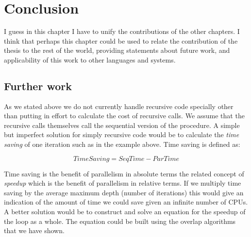 
\chapter{Conclusion}
\label{chap:conc}


I guess in this chapter I have to unify the contributions of the other
chapters.
I think that perhaps this chapter could be used to relate the contribution
of the thesis to the rest of the world, providing statements about future
work, and applicability of this work to other languages and systems.


\section{Further work}
\label{sec:further_work}





As we stated above we do not currently handle recursive code specially other
than putting in effort to calculate the cost of recursive calls.
We assume that the recursive calls themselves call the sequential version of
the procedure.
A simple but imperfect solution for simply recursive code would be to
calculate the \emph{time saving} of one iteration such as in the example
above.
Time saving is defined as:

\begin{equation*}
TimeSaving = SeqTime - ParTime
\end{equation*}

\noindent
Time saving is the benefit of parallelism in absolute terms
the related concept of \emph{speedup} which is the benefit of parallelism in
relative terms.
If we multiply time saving by the average maximum depth (number of
iterations) this would give an indication of the amount of time we could
save given an infinite number of CPUs.
A better solution would be to construct and solve an equation for the
speedup of the loop as a whole.
The equation could be built using the overlap algorithms that we have shown.

